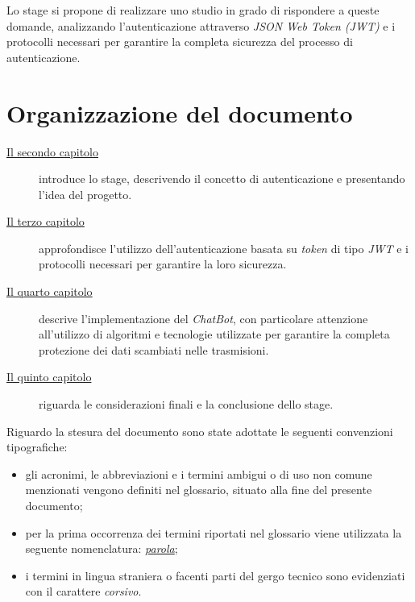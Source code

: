 Lo stage si propone di realizzare uno studio in grado di rispondere a queste domande, analizzando l'autenticazione attraverso \emph{JSON Web Token (JWT)} e i protocolli necessari per garantire la completa sicurezza del processo di autenticazione.


\section{Organizzazione del documento}
\label{sec:organizzazione-documento}

\begin{description}
    \item[{\hyperref[cap:inquadramento-stage]{Il secondo capitolo}}] introduce lo stage, descrivendo il concetto di autenticazione e presentando l'idea del progetto.
    
    \item[{\hyperref[cap:autenticazione-jwt]{Il terzo capitolo}}] approfondisce l'utilizzo dell'autenticazione basata su \emph{\gls{token}} di tipo \emph{JWT} e i protocolli necessari per garantire la loro sicurezza.
    
    \item[{\hyperref[cap:chatbot]{Il quarto capitolo}}] descrive l'implementazione del \emph{ChatBot}, con particolare attenzione all'utilizzo di algoritmi e tecnologie utilizzate per garantire la completa protezione dei dati scambiati nelle trasmisioni. 
    
    \item[{\hyperref[cap:conclusioni]{Il quinto capitolo}}] riguarda le considerazioni finali e la conclusione dello stage.
\end{description}

Riguardo la stesura del documento sono state adottate le seguenti convenzioni tipografiche:
\begin{itemize}
	\item gli acronimi, le abbreviazioni e i termini ambigui o di uso non comune menzionati vengono definiti nel glossario, situato alla fine del presente documento;
	\item per la prima occorrenza dei termini riportati nel glossario viene utilizzata la seguente nomenclatura: \emph{\hyperref[sec:organizzazione-documento]{parola}};
	\item i termini in lingua straniera o facenti parti del gergo tecnico sono evidenziati con il carattere \emph{corsivo}.
\end{itemize}
